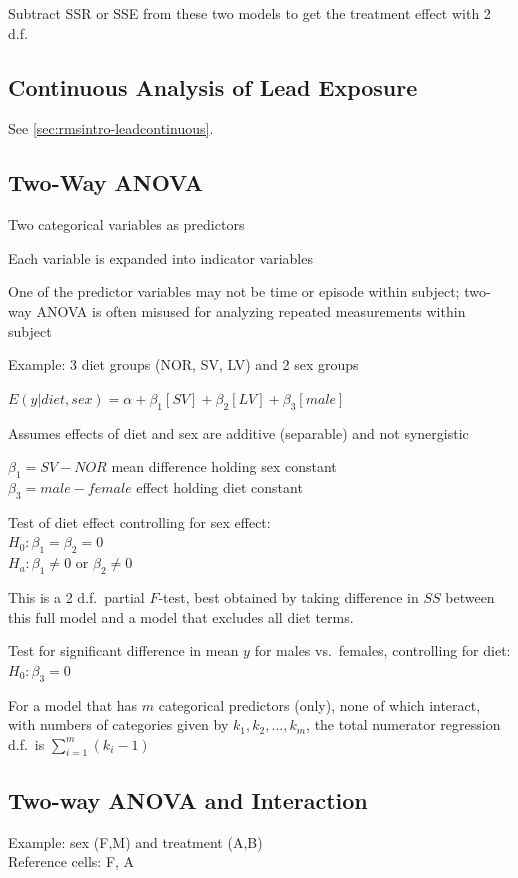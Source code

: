 Subtract SSR or SSE from these two models to get the treatment effect with 2 d.f.
\ei

\subsection{Continuous Analysis of Lead Exposure}
See \ref{sec:rmsintro-leadcontinuous}.

\subsection{Two-Way ANOVA} 
\bi
\item Two categorical variables as predictors
\item Each variable is expanded into indicator variables
\item One of the predictor variables may not be time or episode within
  subject; two-way ANOVA is often misused for analyzing repeated
  measurements within subject
\item Example: 3 diet groups (NOR, SV, LV) and 2 sex groups
\item $E(y|diet,sex) = \alpha + \beta_{1}[SV] + \beta_{2}[LV] +
  \beta_{3}[male]$
\item Assumes effects of diet and sex are additive (separable) and not
  synergistic
\item $\beta_{1} = SV - NOR$ mean difference holding sex constant \\
  $\beta_{3} = male - female$ effect holding diet constant
\item Test of diet effect controlling for sex effect: \\
 $H_{0}:\beta_{1}=\beta_{2}=0$ \\
 $H_{a}: \beta_{1} \neq 0$ or $\beta_{2} \neq 0$
\item This is a 2 d.f.\ partial $F$-test, best obtained by taking
  difference in $SS$ between this full model and a model that excludes
  all diet terms.
\item Test for significant difference in mean $y$ for males vs.\
  females, controlling for diet: \\
 $H_{0}: \beta_{3} = 0$
\item For a model that has $m$ categorical predictors (only), none of
  which interact, with numbers of categories given by $k_{1}, k_{2},
  \ldots, k_{m}$, the total numerator regression d.f.\ is
  $\sum_{i=1}^{m}(k_{i}-1)$
\ei

\subsection{Two-way ANOVA and Interaction}
Example: sex (F,M) and treatment (A,B) \\
Reference cells: F, A\\

